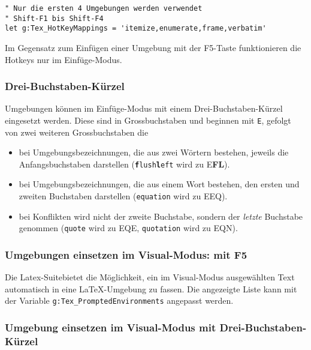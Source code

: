 \documentclass[a4paper,parskip=half,draft=true,DIV=15]{scrartcl}
\newcommand{\LS}{Latex-Suite}
\begin{document}
\begin{lstlisting}[float,caption={Beispiel für Variable \texttt{g:Tex\_HotKeyMappings} in der Datei \texttt{tex.vim} },label=lst:hotkey]
" Nur die ersten 4 Umgebungen werden verwendet
" Shift-F1 bis Shift-F4
let g:Tex_HotKeyMappings = 'itemize,enumerate,frame,verbatim'
\end{lstlisting}

Im Gegensatz zum Einfügen einer Umgebung mit der F5-Taste funktionieren die Hotkeys nur im Einfüge-Modus.

\subsubsection{Drei-Buchstaben-Kürzel}

Umgebungen können im Einfüge-Modus mit einem Drei-Buchstaben-Kürzel eingesetzt werden.
Diese sind in Grossbuchstaben und beginnen mit \texttt{E}, gefolgt von zwei weiteren Grossbuchstaben
die 

\begin{itemize}
  \item bei Umgebungsbezeichnungen, die aus zwei Wörtern bestehen, jeweils die Anfangsbuchstaben darstellen
    (\texttt{\textbf{f}lush\textbf{l}eft} wird zu E\textbf{FL}).
  \item bei Umgebungsbezeichnungen, die aus einem Wort bestehen, den ersten und zweiten Buchstaben darstellen
    (\texttt{equation} wird zu EEQ).
  \item bei Konflikten wird nicht der zweite Buchstabe, sondern der \emph{letzte} Buchstabe genommen
    (\texttt{quote} wird zu EQE, \texttt{quotation} wird zu EQN).
\end{itemize}

\subsubsection{Umgebungen einsetzen im Visual-Modus: mit F5}

Die \LS bietet die Möglichkeit, ein im Visual-Modus ausgewählten Text automatisch in eine LaTeX-Umgebung zu fassen.
Die angezeigte Liste kann mit der Variable \texttt{g:Tex\_PromptedEnvironments} angepasst werden.

\subsubsection{Umgebung einsetzen im Visual-Modus mit Drei-Buchstaben-Kürzel}
\end{document}

